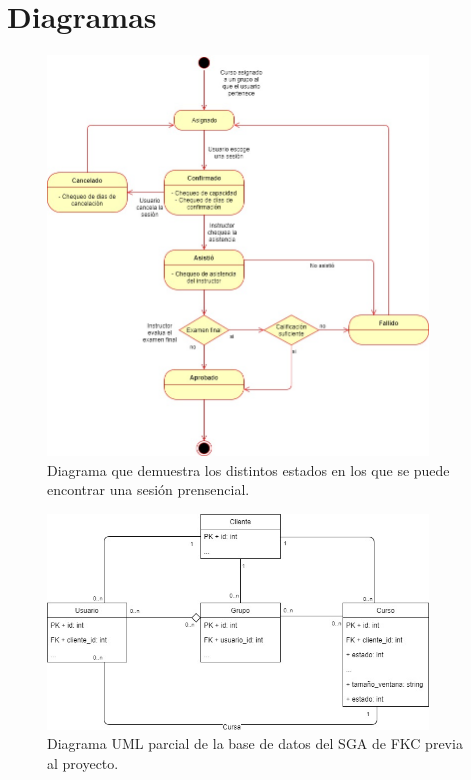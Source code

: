 
\chapter{Diagramas}

\begin{figure}[h]
	\begin{center}
		\includegraphics[width=0.9\textwidth]{figuras/diagramaEstadosSesion.jpg}
		\caption{Diagrama que demuestra los distintos estados en los que se puede encontrar una sesión prensencial.} \label{fig:diagramaEstadosSesion}
	\end{center}
\end{figure}

\begin{figure}[h]
	\begin{center}
		\includegraphics[width=0.9\textwidth]{figuras/databasePrevia.jpg}
		\caption{Diagrama UML parcial de la base de datos del SGA de FKC previa al proyecto.} \label{fig:baseDeDatosPrevia}
	\end{center}
\end{figure}


